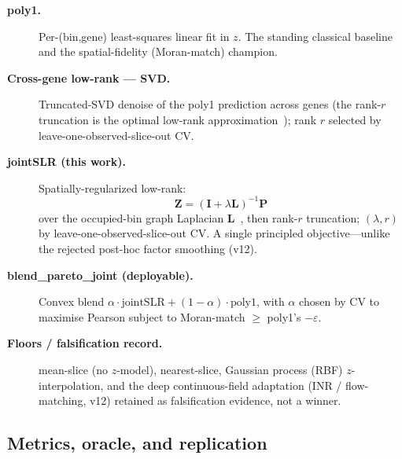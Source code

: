 \documentclass[10pt,letterpaper]{article}
\begin{document}
\begin{description}
  \item[\textbf{poly1.}] Per-(bin,gene) least-squares linear fit in $z$. The standing
  classical baseline and the spatial-fidelity (Moran-match) champion.

  \item[\textbf{Cross-gene low-rank --- SVD.}] Truncated-SVD denoise of the poly1 prediction
  across genes (the rank-$r$ truncation is the optimal low-rank approximation~\cite{eckartyoung});
  rank $r$ selected by leave-one-observed-slice-out CV.

  \item[\textbf{jointSLR (this work).}] Spatially-regularized low-rank:
  \[
    \mathbf{Z} = (\mathbf{I} + \lambda \mathbf{L})^{-1} \mathbf{P}
  \]
  over the occupied-bin graph Laplacian $\mathbf{L}$~\cite{lapeigen,harmonicgraph}, then
  rank-$r$ truncation;
  $(\lambda, r)$ by leave-one-observed-slice-out CV. A single principled objective---unlike
  the rejected post-hoc factor smoothing (v12).

  \item[\textbf{blend\_pareto\_joint (deployable).}] Convex blend
  $\alpha \cdot \text{jointSLR} + (1-\alpha) \cdot \text{poly1}$, with $\alpha$ chosen by
  CV to maximise Pearson subject to Moran-match $\ge$ poly1's $-\varepsilon$.

  \item[\textbf{Floors / falsification record.}] mean-slice (no $z$-model), nearest-slice,
  Gaussian process (RBF) $z$-interpolation, and the deep continuous-field adaptation (INR /
  flow-matching, v12) retained as falsification evidence, not a winner.
\end{description}

\subsection{Metrics, oracle, and replication}
\label{sec:metrics}
\end{document}
